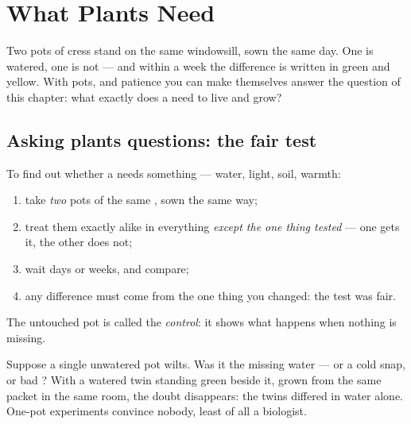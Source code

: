 \chapter{What Plants Need}\label{ch:g4:what-plants-need}

Two pots of cress stand on the same windowsill, sown the same
day. One is watered, one is not --- and within a week the
difference is written in green and yellow. With pots,  and
patience you can make  themselves answer the question of
this chapter: what exactly does a  need to live and grow?

\section{Asking plants questions: the fair test}

\begin{method}\label{met:g4:what-plants-need:fairtest}
To find out whether a  needs something --- water, light,
soil, warmth:
\begin{enumerate}
  \item take \emph{two} pots of the same , sown the same
        way;
  \item treat them exactly alike in everything \emph{except the
        one thing tested} --- one gets it, the other does not;
  \item wait days or weeks, and compare;
  \item any difference must come from the one thing you changed:
        the test was fair.
\end{enumerate}
The untouched pot is called the \emph{control}: it shows what happens when nothing is missing.
\end{method}

\begin{example}\label{ex:g4:what-plants-need:control}
Suppose a single unwatered pot wilts. Was it the missing water
--- or a cold snap, or bad ? With a watered twin standing
green beside it, grown from the same packet in the same room,
the doubt disappears: the twins differed in water alone.
One-pot experiments convince nobody, least of all a biologist.
\end{example}


